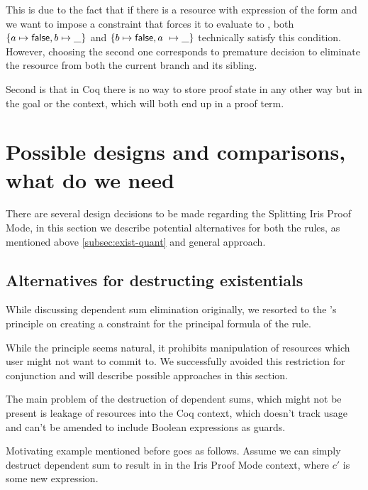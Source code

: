 {This is due to the fact that if there is a resource with expression of the form  and we want to impose a constraint that forces it to evaluate to \false, both \(\left\{a \mapsto \textsf{false}, b \mapsto \_\right\} \) and \(\left\{b \mapsto \textsf{false}, a\ \mapsto \_\right\}\) technically satisfy this condition.
However, choosing the second one corresponds to premature decision to eliminate the resource from both the current branch and its sibling.

Second is that in Coq there is no way to store proof state in any other way but in the goal or the context, which will both end up in a proof term.

\section{Possible designs and comparisons, what do we need}
\label{sec:poss-designs-comp}

There are several design decisions to be made regarding the Splitting Iris Proof Mode, in this section we describe potential alternatives for both the rules, as mentioned above \ref{subsec:exist-quant} and general approach.

\subsection{Alternatives for destructing existentials}
\label{subsec:design_decisions_existential}

While discussing dependent sum elimination originally, we resorted to the \citeauthor{harlandResourceDistributionBooleanConstraints2003}'s principle on creating a constraint for the principal formula of the rule.

While the principle seems natural, it prohibits manipulation of resources which user might not want to commit to.
We successfully avoided this restriction for conjunction and will describe possible approaches in this section.

The main problem of the destruction of dependent sums, which might not be present is leakage of resources into the Coq context, which doesn't track usage and can't be amended to include Boolean expressions as guards.

Motivating example mentioned before goes as follows.
Assume we can simply destruct dependent sum  to result in  in the Iris Proof Mode context, where \(c'\) is some new expression.

}
